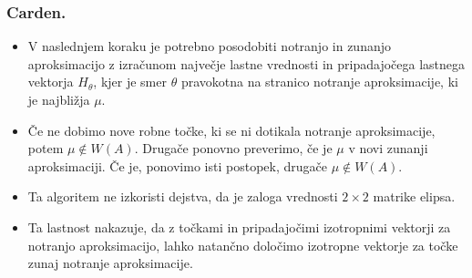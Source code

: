 \documentclass{beamer}
\begin{document}
\begin{frame}
\frametitle{Carden.}
\begin{itemize}
\item V naslednjem koraku je potrebno posodobiti notranjo in zunanjo aproksimacijo z izračunom največje lastne vrednosti in pripadajočega lastnega vektorja $H_{\theta}$, kjer je smer $\theta$ pravokotna na stranico notranje aproksimacije, ki je najbližja $\mu$.
\item Če ne dobimo nove robne točke, ki se ni dotikala notranje aproksimacije, potem $\mu \not \in W(A)$. Drugače ponovno preverimo, če je $\mu$  v novi zunanji aproksimaciji. Če je, ponovimo isti postopek, drugače $\mu \not \in W(A)$. 
\item Ta algoritem ne izkoristi dejstva, da je zaloga vrednosti $2\times2$ matrike elipsa. 
\item Ta lastnost nakazuje, da z točkami in pripadajočimi izotropnimi vektorji za notranjo aproksimacijo, lahko natančno določimo izotropne vektorje za točke zunaj notranje aproksimacije.
\end{itemize}
\end{frame}
\end{document}
